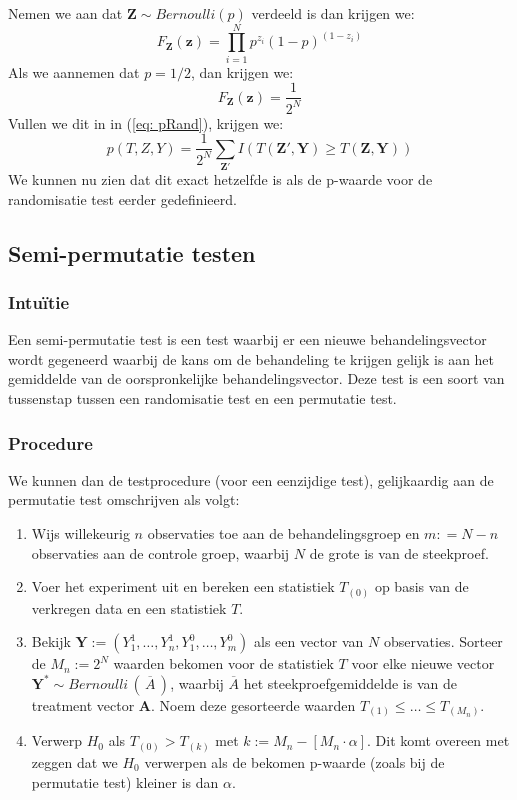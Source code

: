 \documentclass[12pt, a4paper, faculty=we]{ugent-doc}
\newcommand{\bfZ}{\textbf{Z}}
\begin{document}
\begin{flushleft}
    Nemen we aan dat $\bfZ \sim Bernoulli(p)$ verdeeld is dan krijgen we: 
    $$F_{\mathbf{Z}}(\mathbf{z}) = \prod_{i=1}^{N} p^{z_i} (1-p)^{(1-z_i)}  $$
    Als we aannemen dat $p = 1/2$, dan krijgen we:
    $$F_{\mathbf{Z}}(\mathbf{z}) = \frac{1}{2^N}$$
    Vullen we dit in in (\ref{eq: pRand}), krijgen we:
    $$p(T,Z,Y) = \frac{1}{2^N} \sum_{\mathbf{Z}'} I(T(\mathbf{Z}' , \mathbf{Y}) \geq T(\mathbf{Z} , \mathbf{Y}))$$
    We kunnen nu zien dat dit exact hetzelfde is als de p-waarde voor de randomisatie test eerder gedefinieerd.
\end{flushleft}


\subsection{Semi-permutatie testen}

\subsubsection{Intuïtie}
\begin{flushleft}
    Een semi-permutatie test is een test waarbij er een nieuwe behandelingsvector
    wordt gegeneerd waarbij de kans om de behandeling te krijgen gelijk is aan
    het gemiddelde van de oorspronkelijke behandelingsvector. Deze test is een soort van tussenstap 
    tussen een randomisatie test en een permutatie test.
\end{flushleft}

\subsubsection{Procedure}

\begin{flushleft}
    We kunnen dan de testprocedure (voor een eenzijdige test), gelijkaardig aan de permutatie test omschrijven als volgt:
    \begin{enumerate}
        \item Wijs willekeurig \(n\) observaties toe aan de behandelingsgroep en \(m : = N-n\) observaties aan de controle groep, waarbij $N$ de grote is van de steekproef.
        \item Voer het experiment uit en bereken een statistiek \(T_{(0)}\) op basis van de verkregen data en een statistiek \(T\).
        \item Bekijk \(\mathbf{Y} := (Y^1_1, \ldots, Y^1_n, Y^0_1, \ldots, Y^0_m)\) als een vector van \(N\) observaties. Sorteer de \(M_n := 2^N\) 
        waarden bekomen voor de statistiek \(T\) voor elke nieuwe vector \(\mathbf{Y}^* \sim  Bernoulli \, ( \, \overline{A} \, )\), waarbij $\overline{A} $ het steekproefgemiddelde is van de treatment vector $\mathbf{A}$. 
        Noem deze gesorteerde waarden 
        \(T_{(1)}  \leq \ldots \leq T_{(M_n)}\).
        \item Verwerp \(H_0\) als \(T_{(0)} > T_{(k)}\) met \(k:= M_n-[M_n\cdot\alpha]\). Dit komt overeen met zeggen dat we \(H_0\) verwerpen als 
        de bekomen p-waarde (zoals bij de permutatie test) kleiner is dan \(\alpha\).
    \end{enumerate}
\end{flushleft}
\end{document}
